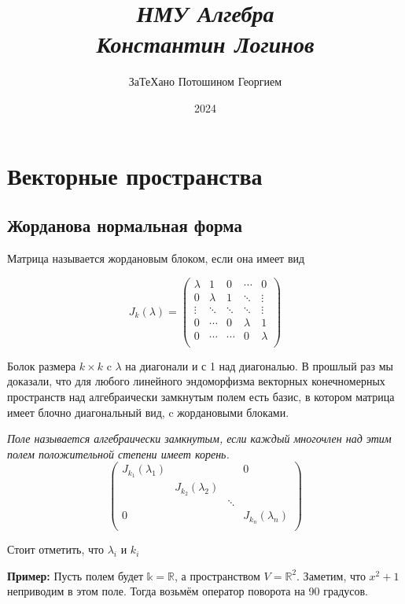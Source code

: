 \documentclass[a4paper, 12pt]{book}
\title{
\textit{\huge{НМУ Алгебра\\Константин Логинов}}
}
\date{2024}
\author{\small{ЗаТеХано Потошином Георгием}}
\begin{document}
\maketitle
\chapter{Векторные пространства}
\section{Жорданова нормальная форма}
Матрица называется жордановым блоком, если она имеет вид

\[J_k(\lambda)=\left(\begin{array}{ccccc}
    \lambda & 1       & 0      & \cdots  & 0\\
    0       & \lambda & 1      & \ddots  & \vdots\\
    \vdots  & \ddots  & \ddots & \ddots  & \vdots\\
    0       & \cdots  & 0      & \lambda & 1\\
    0       & \cdots  & \cdots & 0       & \lambda\\
\end{array}\right)\]

Болок размера $k\times k$ c $\lambda$ на диагонали и с 1 над диагональю. В
прошлый раз мы доказали, что для любого линейного эндоморфизма векторных
конечномерных пространств над алгебраически замкнутым полем есть базис, в
котором матрица имеет блочно диагональный вид, c жордановыми блоками.

\textit{Поле называется алгебраически замкнутым, если каждый многочлен над этим
полем положительной степени имеет корень.}
\[
    \left(\begin{array}{cccc}
        J_{k_1}(\lambda_1) &                    &        & 0\\
                           & J_{k_2}(\lambda_2) &        & \\
                           &                    & \ddots & \\
        0                  &                    &        & J_{k_n}(\lambda_n)\\
    \end{array}\right)
\]

Стоит отметить, что $\lambda_i$ и $k_i$

\textbf{Пример:} Пусть полем будет $\mathbb{k}=\mathbb{R}$, а пространством
$V=\mathbb{R}^2$. Заметим, что $x^2+1$ неприводим в этом поле. Тогда возьмём
оператор поворота на 90 градусов.
\end{document}
